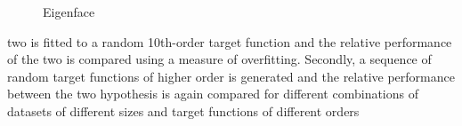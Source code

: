 \documentclass[a4paper,10pt]{article}
\begin{document}
\begin{figure}[H]
{    \label{fig:mean_face}
  }
  \caption{Eigenface}
\end{figure}

two is fitted to a random 10th-order target function and the relative performance of the two is compared using a measure of overfitting.
Secondly, a sequence of random target functions of higher order is generated and the
relative performance between the two hypothesis is again compared for different combinations of
datasets of different sizes and target functions of different orders
\end{document}

